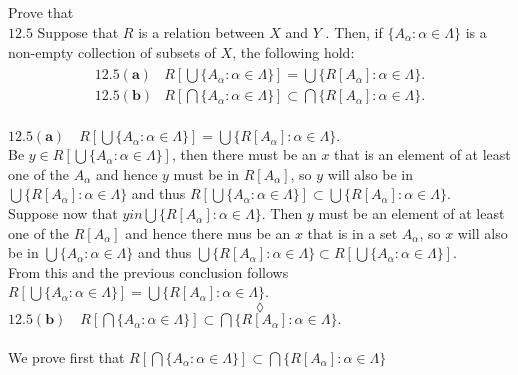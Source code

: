 \subsection{}
\begin{tcolorbox}
Prove that \\
$\mathbf{12.5}$ Suppose that $R$ is a relation between $X$ and $Y$ . Then, if $\{A_{\alpha}:\alpha \in \Lambda\}$ is a non-empty collection of subsets of $X$, the following hold:
\begin{align*}
\begin{array}{ll}
\mathbf{12.5(a)}&R\left[\bigcup\{A_{\alpha}:\alpha \in \Lambda\}\right]= \bigcup\{R[A_{\alpha}]:\alpha \in \Lambda\}. \\
\mathbf{12.5(b)}&R\left[\bigcap\{A_{\alpha}:\alpha \in \Lambda\}\right]\subset \bigcap\{R[A_{\alpha}]:\alpha \in \Lambda\}. \\
\end{array}
\end{align*}
\end{tcolorbox}
$$ $$
$\mathbf{12.5(a)}\quad R\left[\bigcup\{A_{\alpha}:\alpha \in \Lambda\}\right]= \bigcup\{R[A_{\alpha}]:\alpha \in \Lambda\}. $\\
Be $y \in R\left[\bigcup\{A_{\alpha}:\alpha \in \Lambda\}\right]$, then there must be an $x$ that is an element of at least one of the $A_{\alpha}$ and hence $y$ must be in $R[A_{\alpha}]$, so $y$ will also be in $\bigcup\{R[A_{\alpha}]:\alpha \in \Lambda\}$ and thus $R\left[\bigcup\{A_{\alpha}:\alpha \in \Lambda\}\right]\subset \bigcup\{R[A_{\alpha}]:\alpha \in \Lambda\}$.\\
Suppose now that $yin \bigcup\{R[A_{\alpha}]:\alpha \in \Lambda\}$. Then $y$ must be  an element of at least one of the $R[A_{\alpha}]$ and hence there mus be an $x$ that is in a set $A_{\alpha}$, so $x$ will also be in $\bigcup\{A_{\alpha}:\alpha \in \Lambda\}$ and thus $\bigcup\{R[A_{\alpha}]:\alpha \in \Lambda\}\subset R\left[\bigcup\{A_{\alpha}:\alpha \in \Lambda\}\right]$.\\
From this and the previous conclusion follows $R\left[\bigcup\{A_{\alpha}:\alpha \in \Lambda\}\right]= \bigcup\{R[A_{\alpha}]:\alpha \in \Lambda\}$.
$$\lozenge$$
$\mathbf{12.5(b)}\quad R\left[\bigcap\{A_{\alpha}:\alpha \in \Lambda\}\right]\subset \bigcap\{R[A_{\alpha}]:\alpha \in \Lambda\}. $\\\\
We prove first that  $R\left[\bigcap\{A_{\alpha}:\alpha \in \Lambda\}\right]\subset \bigcap\{R[A_{\alpha}]:\alpha \in \Lambda\}$\\
